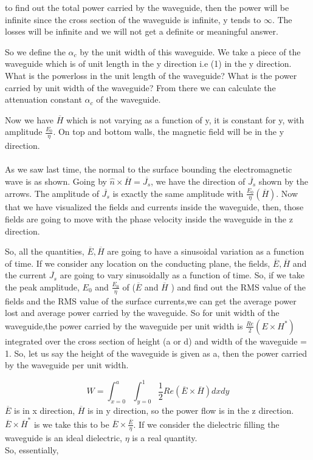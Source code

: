 to find out the total power carried by the waveguide, then the power will be infinite since the cross section of the waveguide is infinite, y tends to $\infty$. The losses will be infinite and we will not get a definite or meaningful answer.

So we define the $\alpha_{c}$ by the unit width of this waveguide. We take a piece of the waveguide which is of unit length in the y direction i.e (1) in the y direction. What is the powerloss in the unit length of the waveguide? What is the power carried by unit width of the waveguide? From there we can calculate the attenuation constant $\alpha_{c}$ of the waveguide. 

Now we have $\overline{H}$ which is not varying as a function of y, it is constant for y, with amplitude $\frac{E_0}{\eta}$. On top and bottom walls, the magnetic field will be in the y direction.\\\\ As we saw last time, the normal to the surface bounding the electromagnetic wave is as shown. Going by $\hat{n}\times\overline{H}=\overline{J_s}$, we have the direction of $\overline{J_s}$ shown by the arrows. The amplitude of $\overline{J_s}$ is exactly the same amplitude with $\frac{E_0}{\eta}(\overline{H})$. Now that we have visualized the fields and currents inside the waveguide, then, those fields are going to move with the phase velocity inside the waveguide in the z direction.

So, all the  quantities, $\overline{E}, \overline{H}$ are going to have a sinusoidal variation as a function of time. If we consider any location on the conducting plane, the fields, $\overline{E}, \overline{H}$ and the current $\overline{J_s}$ are going to vary sinusoidally as a function of time. So, if we take the peak amplitude, $E_0$ and $\frac{E_0}{\eta}$ of ($\overline{E}$ and $\overline{H}$ ) and find out the RMS value of the fields and the RMS value of the surface currents,we can get the average power lost and average power carried by the waveguide. So for unit width of the waveguide,the power carried by the waveguide per unit width is $\frac{Re}{2}(E \times H^*)$ integrated over the cross section of height (a or d) and width of the waveguide = 1. So, let us say the height of the waveguide is given as a, then the power carried by the waveguide per unit width.

\begin{equation}
W=\int_{x=0}^{a}\int_{y=0}^{1} \frac{1}{2}Re{(\overline{E} \times \overline{H})dxdy}	
\end{equation}
$\overline{E}$ is in x direction, $\overline{H}$ is in y direction, so the power flow is in the z direction. $\overline{E} \times \overline{H}^*$ is we take this to be $\overline{E} \times \frac{\overline{E}}{\eta}$. If we consider the dielectric filling the waveguide is an ideal dielectric, $\eta$ is a real quantity. \\
So, essentially,

